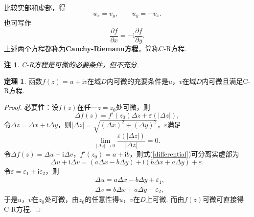 \documentclass[12pt]{ctexart}
\theoremstyle{definition}
\newtheorem{theorem}{定理}
\theoremstyle{plain}
\newtheorem*{remark}{注}
\newcommand{\iu}{\mathrm{i}}
\begin{document}
	比较实部和虚部，得
	\begin{equation}
		u_x=v_y,\qquad u_y=-v_x.
	\end{equation}
	也可写作
	\begin{equation}
		\frac{\partial f}{\partial x}=-\iu\frac{\partial f}{\partial y}.
	\end{equation}
	上述两个方程都称为\textbf{Cauchy-Riemann方程}，简称C-R方程.
	\begin{remark}
		C-R方程是可微的必要条件，但不充分.
	\end{remark}
	\begin{theorem}
		函数$f(z)=u+\iu v$在域$D$内可微的充要条件是$u$，$v$在域$D$内可微且满足C-R方程.
	\end{theorem}
	\begin{proof}
		必要性：设$f(z)$在任一$z=z_0$处可微，则
		\begin{equation}\label{differential}
			\Delta f(z)=f'(z_0)\Delta z+\varepsilon\left(|\Delta z|\right),
		\end{equation}
		令$\Delta z=\Delta x+\iu\Delta y$，则$|\Delta z|=\sqrt{(\Delta x)^2+(\Delta y)^2}$，$\varepsilon$满足
		\begin{equation}
			\lim\limits_{|\Delta z|\to 0}\frac{\varepsilon(|\Delta z|)}{|\Delta z|}=0.
		\end{equation}
		令$\Delta f(z)=\Delta u+\iu\Delta v$，$f'(z_0)=a+\iu b$，则式(\ref{differential})可分离实虚部为
		\begin{equation}
			\Delta u+\iu\Delta v=\left(a\Delta x-b\Delta y\right)+\iu\left(b\Delta x+a\Delta y\right)+\varepsilon.
		\end{equation}
		令$\varepsilon=\varepsilon_1+\iu\varepsilon_2$，则
		\begin{equation}
			\begin{aligned}
				&\Delta u=a\Delta x-b\Delta y+\varepsilon_1,\\
				&\Delta v=b\Delta x+a\Delta y+\varepsilon_2,
			\end{aligned}
		\end{equation}
		于是$u$，$v$在$z_0$处可微，由$z_0$的任意性得$u$，$v$在$D$上可微. 而由$f(z)$可微可直接得C-R方程.
		

\end{proof}
\end{document}
